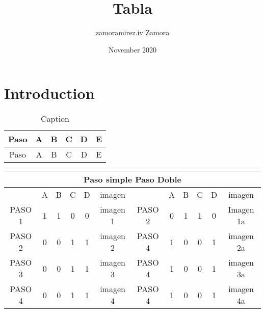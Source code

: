 \documentclass{article}
\title{Tabla}
\author{zamoramirez.iv Zamora}
\date{November 2020}
\begin{document}
\maketitle

\section{Introduction}

\begin{table}[h!]
    \centering
    \begin{tabular}{c|c|c|c|c|c}
    \hline
          Paso & A & B & C & D & E \\ 
          \hline
          Paso & A & B & C & D & E \\
    \end{tabular}
    \caption{Caption}
    \label{tab:my_label}
\end{table}


\begin{table} [h!]
	\centering
	\label{tabla:pasoDobleySimple}
		\begin{tabular}{|c|c|c|c|c|c|c|c|c|c|c|c|}
			\hline 
			\multicolumn{12}{|c|}{Paso simple       \hspace{40mm}         Paso Doble}
			\\ 
			\hline 
			 & A  &  B & C  & D & imagen & & A & B & C & D & imagen \\ 
			\hline 
			PASO 1  & 1 & 1 & 0 & 0 & imagen 1 & PASO 2 & 0 & 1 & 1 & 0 & Imagen 1a\\ 
			\hline 
			PASO 2 & 0 & 0 & 1 & 1 & imagen 2 & PASO 4 & 1 & 0 & 0 & 1 & imagen 2a \\ 
			\hline
			PASO 3 & 0 & 0 & 1 & 1 & imagen 3 & PASO 4 & 1 & 0 & 0 & 1 & imagen 3a \\ 
			\hline
			PASO 4 & 0 & 0 & 1 & 1 & imagen 4 & PASO 4 & 1 & 0 & 0 & 1 & imagen 4a \\ 
			\hline
		\end{tabular} 
\end{table}
\end{document}
